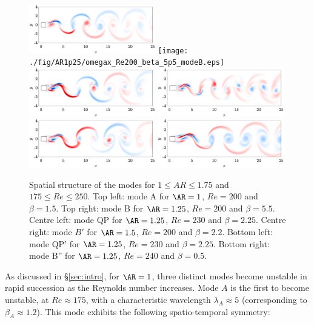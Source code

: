 %
\begin{figure}
  \centering
  \includegraphics[width=0.49\textwidth]{./fig/AR1/omegax_Re200_beta_1p5_modeA.eps}
  \texttt{[image: ./fig/AR1p25/omegax\_Re200\_beta\_5p5\_modeB.eps]}
  \includegraphics[width=0.49\textwidth]{./fig/AR1p25/omegax_Re230_beta_2p25_modeC.eps}
  \includegraphics[width=0.49\textwidth]{./fig/AR1p5/omegax_Re200_beta_2p2_modeBp.eps}
  \includegraphics[width=0.49\textwidth]{./fig/AR1p25/omegax_Re230_beta_2p25_modeD.eps}
  \includegraphics[width=0.49\textwidth]{./fig/AR1p25/omegax_Re240_beta_0p5_modeBpp.eps}
  \caption{Spatial structure of the modes for $1 \le AR \le 1.75$ and $175 \le Re \le 250$. Top left: mode A for $\AR=1$, $Re=200$ and $\beta=1.5$. Top right: mode B for $\AR=1.25$, $Re=200$ and $\beta=5.5$. Centre left: mode QP for $\AR=1.25$, $Re=230$ and $\beta = 2.25$. Centre right: mode $B'$ for $\AR=1.5$, $Re=200$ and $\beta=2.2$. Bottom left: mode QP' for $\AR=1.25$, $Re=230$ and $\beta=2.25$. Bottom right: mode B'' for $\AR=1.25$, $Re=240$ and $\beta=0.5$.}
  \label{fig:modes}
\end{figure}
%
As discussed in \S\ref{sec:intro}, for $\AR=1$, three distinct modes become unstable in rapid succession as the Reynolds number increases. Mode $A$ is the first to become unstable, at $Re \approx 175$, with a characteristic wavelength $\lambda_A \approx 5$ (corresponding to $\beta_A \approx 1.2$). This mode exhibits the following spatio-temporal symmetry:
